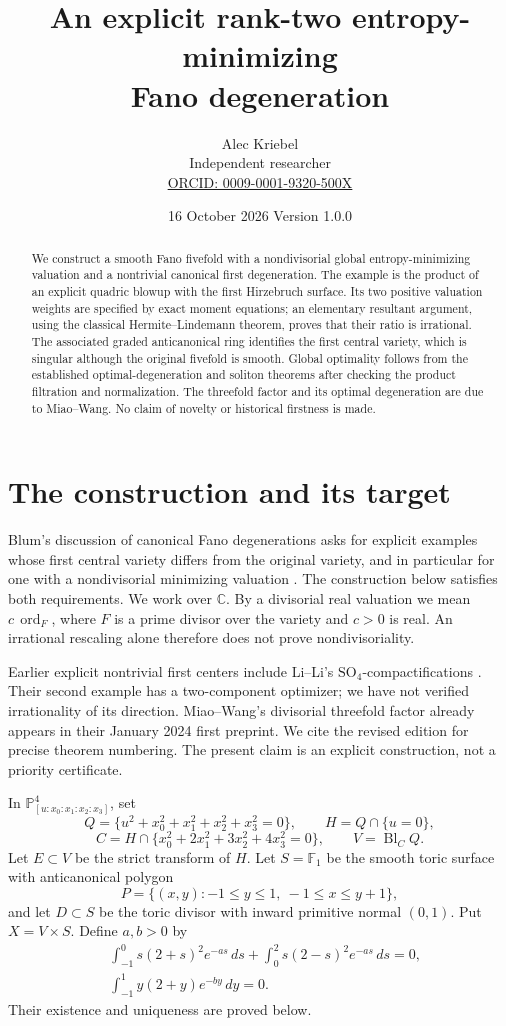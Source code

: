 \documentclass[11pt,a4paper]{article}
\title{An explicit rank-two entropy-minimizing\\ Fano degeneration}
\author{Alec Kriebel\\{\small Independent researcher}\\
{\small\href{https://orcid.org/0009-0001-9320-500X}{ORCID: 0009-0001-9320-500X}}}
\date{16 October 2026 \quad Version 1.0.0}
\newcommand{\C}{\mathbb C}
\newcommand{\ord}{\operatorname{ord}}
\newcommand{\Bl}{\operatorname{Bl}}
\begin{document}
\maketitle
\begin{abstract}
We construct a smooth Fano fivefold with a nondivisorial global
entropy-minimizing valuation and a nontrivial canonical first degeneration.
The example is the product of an explicit quadric blowup with the first
Hirzebruch surface. Its two positive valuation weights are specified by exact
moment equations; an elementary resultant argument, using the classical
Hermite--Lindemann theorem, proves that their ratio is irrational.
The associated graded anticanonical ring identifies the first central
variety, which is singular although the original fivefold is smooth.
Global optimality follows from the established optimal-degeneration and
soliton theorems after checking the product filtration and normalization.
The threefold factor and its optimal degeneration are due to Miao--Wang.
No claim of novelty or historical firstness is made.
\end{abstract}

\section{The construction and its target}

Blum's discussion of canonical Fano degenerations asks for explicit examples
whose first central variety differs from the original variety, and in
particular for one with a nondivisorial minimizing valuation
\cite[pp.~888--889]{OWR}. The construction below satisfies both requirements.
We work over \(\C\). By a divisorial real valuation we mean
\(c\,\ord_F\), where \(F\) is a prime divisor over the variety and \(c>0\)
is real. An irrational rescaling alone therefore does not prove
nondivisoriality.

Earlier explicit nontrivial first centers include Li--Li's
\(\mathrm{SO}_4\)-compactifications \cite[\S6]{LL}.
Their second example has a two-component optimizer; we have not verified
irrationality of its direction. Miao--Wang's divisorial threefold factor
already appears in their January 2024 first preprint.
We cite the revised edition for precise theorem numbering.
The present claim is an explicit construction, not a priority certificate.

In \(\mathbb P^4_{[u:x_0:x_1:x_2:x_3]}\), set
\[
 Q=\{u^2+x_0^2+x_1^2+x_2^2+x_3^2=0\},\qquad H=Q\cap\{u=0\},
\]
\[
 C=H\cap\{x_0^2+2x_1^2+3x_2^2+4x_3^2=0\},\qquad V=\Bl_C Q.
\]
Let \(E\subset V\) be the strict transform of \(H\). Let \(S=\mathbb F_1\)
be the smooth toric surface with anticanonical polygon
\[
 P=\{(x,y):-1\leq y\leq1,\ -1\leq x\leq y+1\},
\]
and let \(D\subset S\) be the toric divisor with inward primitive normal
\((0,1)\). Put \(X=V\times S\).
Define \(a,b>0\) by
\begin{align}
 &\int_{-1}^0 s(2+s)^2e^{-as}\,ds+
             \int_0^2 s(2-s)^2e^{-as}\,ds=0, \label{eq:a}\\
 &\int_{-1}^1 y(2+y)e^{-by}\,dy=0. \label{eq:b}
\end{align}
Their existence and uniqueness are proved below.
\end{document}
